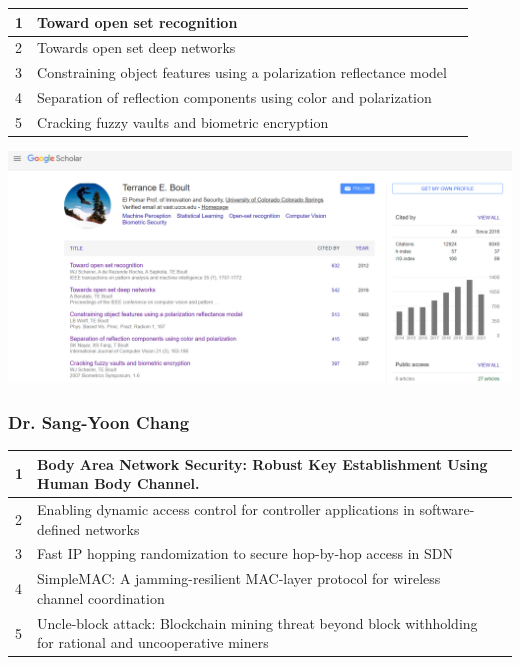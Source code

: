 \documentclass[11pt]{article}
\begin{document}
\begin{center}
\begin{tabular}{ | m{.5cm} | m{10cm}| m{1cm} | } 
  \hline
  1 & Toward open set recognition & \cite{scheirer_toward_2013} \\ 
  \hline
  2 & Towards open set deep networks  & \cite{bendale_towards_2016} \\ 
  \hline
  3 & Constraining object features using a polarization reflectance model  & \cite{noauthor_constraining_nodate} \\  
  \hline
  4 & Separation of reflection components using color and polarization  & \cite{nayar_separation_1997} \\ 
  \hline
  5 & Cracking fuzzy vaults and biometric encryption & \cite{scheirer_cracking_2007} \\ 
  \hline
\end{tabular}
\end{center}

\begin{center}
\includegraphics[scale=0.45]{terry1.PNG}
\end{center}

\subsubsection{Dr. Sang-Yoon Chang}

\begin{center}
\begin{tabular}{ | m{.5cm} | m{10cm}| m{1cm} | } 
  \hline
  1 & Body Area Network Security: Robust Key Establishment Using Human Body Channel. & \cite{chang_body_nodate} \\ 
  \hline
  2 & Enabling dynamic access control for controller applications in software-defined networks  & \cite{padekar_enabling_2016} \\ 
  \hline
  3 & Fast IP hopping randomization to secure hop-by-hop access in SDN  & \cite{chang_fast_2019} \\  
  \hline
  4 & SimpleMAC: A jamming-resilient MAC-layer protocol for wireless channel coordination  & \cite{chang_simplemac_2012} \\ 
  \hline
  5 & Uncle-block attack: Blockchain mining threat beyond block withholding for rational and uncooperative miners & \cite{noauthor_uncle-block_nodate} \\ 
  \hline
\end{tabular}
\end{center}
\end{document}

